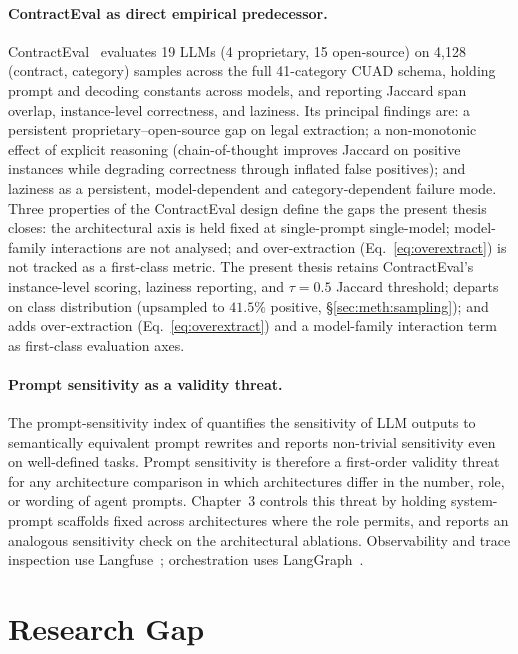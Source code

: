 \paragraph{ContractEval as direct empirical predecessor.}
ContractEval~\cite{liu2025contracteval} evaluates 19 LLMs (4 proprietary, 15
open-source) on 4{,}128 (contract, category) samples across the full 41-category CUAD
schema, holding prompt and decoding constants across models, and reporting Jaccard span
overlap, instance-level correctness, and laziness. Its principal findings are: a
persistent proprietary--open-source gap on legal extraction; a non-monotonic effect of
explicit reasoning (chain-of-thought improves Jaccard on positive instances while
degrading correctness through inflated false positives); and laziness as a persistent,
model-dependent and category-dependent failure mode. Three properties of the
ContractEval design define the gaps the present thesis closes: the architectural axis
is held fixed at single-prompt single-model; model-family interactions are not
analysed; and over-extraction (Eq.~\eqref{eq:overextract}) is not tracked as a
first-class metric. The present thesis retains ContractEval's instance-level
scoring, laziness reporting, and $\tau{=}0.5$ Jaccard threshold; departs on
class distribution (upsampled to $41.5\%$ positive, \S\ref{sec:meth:sampling});
and adds over-extraction (Eq.~\eqref{eq:overextract}) and a model-family
interaction term as first-class evaluation axes.

\paragraph{Prompt sensitivity as a validity threat.}
The prompt-sensitivity index of \textcite{chatterjee2024posix}
quantifies the sensitivity of LLM outputs to semantically equivalent prompt
rewrites and reports non-trivial sensitivity even on well-defined tasks.
Prompt sensitivity is therefore a first-order validity threat for any
architecture comparison in which architectures differ in the number, role,
or wording of agent prompts. Chapter~3 controls this threat by holding
system-prompt scaffolds fixed across architectures where the role permits,
and reports an analogous sensitivity check on the architectural ablations.
Observability and trace inspection use Langfuse~\cite{langfuse2024};
orchestration uses LangGraph~\cite{langgraph2024}.

\section{Research Gap}\label{sec:lit:synthesis}

